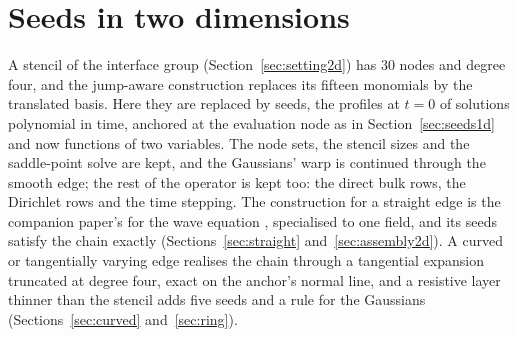 \documentclass[11pt]{amsart}
\theoremstyle{definition}
\theoremstyle{remark}
\begin{document}
\section{Seeds in two dimensions}
\label{sec:seeds2d}
A stencil of the interface group (Section~\ref{sec:setting2d}) has $30$
nodes and degree four, and the jump-aware construction replaces its fifteen
monomials by the translated basis. Here they are replaced by seeds, the
profiles at $t = 0$ of solutions polynomial in time, anchored at the
evaluation node as in Section~\ref{sec:seeds1d} and now functions of two
variables. The node sets, the stencil sizes and the saddle-point solve are
kept, and the Gaussians' warp is continued through the smooth edge; the
rest of the operator is kept too: the direct bulk rows, the Dirichlet rows
and the time stepping. The construction for a straight edge is the companion
paper's for the wave equation \cite{Martin2026seeds}, specialised to one
field, and its seeds satisfy the chain exactly (Sections~\ref{sec:straight}
and~\ref{sec:assembly2d}). A curved or tangentially varying edge realises
the chain through a tangential expansion truncated at degree four, exact on
the anchor's normal line, and a resistive layer thinner than the stencil
adds five seeds and a rule for the Gaussians (Sections~\ref{sec:curved}
and~\ref{sec:ring}).
\end{document}
